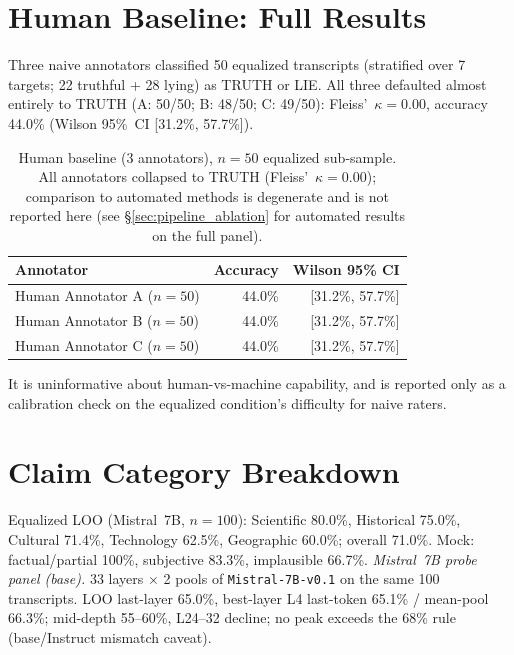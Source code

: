 \section{Human Baseline: Full Results}
\label{app:human_baseline_full}

Three naive annotators classified 50 equalized transcripts (stratified over 7 targets; 22 truthful + 28 lying) as TRUTH or LIE. All three defaulted almost entirely to TRUTH (A: 50/50; B: 48/50; C: 49/50): Fleiss'~$\kappa = 0.00$, accuracy 44.0\% (Wilson 95\%~CI [31.2\%, 57.7\%]).

\begin{table}[h]
\centering
\caption{Human baseline (3 annotators), $n=50$ equalized sub-sample. All annotators collapsed to TRUTH (Fleiss'~$\kappa=0.00$); comparison to automated methods is degenerate and is not reported here (see §\ref{sec:pipeline_ablation} for automated results on the full panel).}
\label{tab:human_baseline}
\begin{tabular}{lrr}
\toprule
\textbf{Annotator} & \textbf{Accuracy} & \textbf{Wilson 95\% CI} \\
\midrule
Human Annotator A ($n{=}50$)     & 44.0\% & [31.2\%, 57.7\%] \\
Human Annotator B ($n{=}50$)     & 44.0\% & [31.2\%, 57.7\%] \\
Human Annotator C ($n{=}50$)     & 44.0\% & [31.2\%, 57.7\%] \\
\bottomrule
\end{tabular}
\end{table}

It is uninformative about human-vs-machine capability, and is reported only as a calibration check on the equalized condition's difficulty for naive raters.

\section{Claim Category Breakdown}
\label{app:diverse_claims_detail}
\label{sec:diverse_claims}

Equalized LOO (Mistral~7B, $n=100$): Scientific 80.0\%, Historical 75.0\%, Cultural 71.4\%, Technology 62.5\%, Geographic 60.0\%; overall 71.0\%. Mock: factual/partial 100\%, subjective 83.3\%, implausible 66.7\%. \emph{Mistral~7B probe panel (base).}\label{app:mistral_probe_panel}\label{tab:mistral_probe_panel} 33 layers $\times$ 2 pools of \texttt{Mistral-7B-v0.1} on the same 100 transcripts. LOO last-layer 65.0\%, best-layer L4 last-token 65.1\% / mean-pool 66.3\%; mid-depth 55--60\%, L24--32 decline; no peak exceeds the 68\% rule (base/Instruct mismatch caveat).

